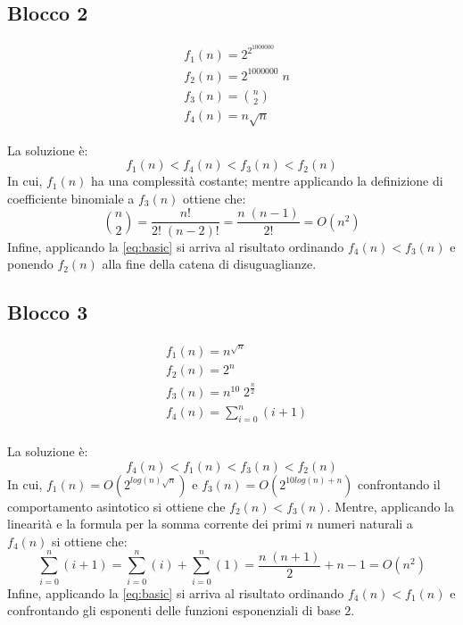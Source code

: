 \documentclass{article}
\begin{document}
\subsection{Blocco 2}

\begin{equation*}
    \begin{split}
        & f_1(n) = 2^{2^{1000000}}\\
        & f_2(n) = 2^1000000\; n \\
        & f_3(n) =  \binom{n}{2} \\
        & f_4(n) = n\sqrt{n}
    \end{split}
\end{equation*}

La soluzione è:
\begin{equation*}
    f_1(n) < f_4(n) < f_3(n) < f_2(n) 
\end{equation*}
In cui, $f_1(n)$ ha una complessità costante; mentre applicando la definizione di coefficiente binomiale a $f_3(n)$ ottiene che:
\begin{equation*}
    \binom{n}{2} = \frac{n!}{2! \; (n - 2)!} = \frac{n\; (n-1)}{2!} = O(n^2)
\end{equation*}
Infine, applicando la \cref{eq:basic} si arriva al risultato ordinando $f_4(n) < f_3(n)$ e ponendo $f_2(n)$ alla fine della catena di disuguaglianze.

\subsection{Blocco 3}

\begin{equation*}
    \begin{split}
        & f_1(n) = n^{\sqrt{n}} \\
        & f_2(n) = 2^n \\
        & f_3(n) = n^{10}\; 2^{\frac{n}{2}} \\
        & f_4(n) =  \sum_{i=0}^{n}(i+1) \\
    \end{split}
\end{equation*}

La soluzione è:
\begin{equation*}
    f_4(n) < f_1(n) < f_3(n) < f_2(n) 
\end{equation*}
In cui, $f_1(n) = O(2^{log(n)\sqrt{n}})$ e $f_3(n) = O(2^{10log(n) + n})$ confrontando il comportamento asintotico si ottiene che $f_2(n) < f_3(n)$. Mentre, applicando la linearità e la formula per la somma corrente dei primi $n$ numeri naturali a $f_4(n)$ si ottiene che:
\begin{equation*}
    \sum_{i=0}^{n}(i+1) = \sum_{i=0}^{n}(i) + \sum_{i=0}^{n}(1) = \frac{n\; (n+1)}{2} + n -1  = O(n^2)
\end{equation*}
Infine, applicando la \cref{eq:basic} si arriva al risultato ordinando $f_4(n) < f_1(n)$ e confrontando gli esponenti delle funzioni esponenziali di base $2$.
\end{document}
